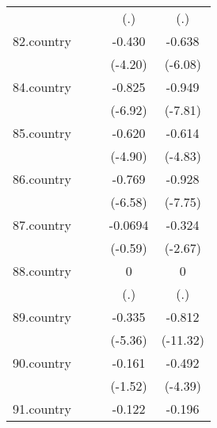 {\begin{tabular}{l*{4}{c}}
            &                     &                     &         (.)         &         (.)         \\
[1em]
82.country  &                     &                     &      -0.430\sym{***}&      -0.638\sym{***}\\
            &                     &                     &     (-4.20)         &     (-6.08)         \\
[1em]
84.country  &                     &                     &      -0.825\sym{***}&      -0.949\sym{***}\\
            &                     &                     &     (-6.92)         &     (-7.81)         \\
[1em]
85.country  &                     &                     &      -0.620\sym{***}&      -0.614\sym{***}\\
            &                     &                     &     (-4.90)         &     (-4.83)         \\
[1em]
86.country  &                     &                     &      -0.769\sym{***}&      -0.928\sym{***}\\
            &                     &                     &     (-6.58)         &     (-7.75)         \\
[1em]
87.country  &                     &                     &     -0.0694         &      -0.324\sym{**} \\
            &                     &                     &     (-0.59)         &     (-2.67)         \\
[1em]
88.country  &                     &                     &           0         &           0         \\
            &                     &                     &         (.)         &         (.)         \\
[1em]
89.country  &                     &                     &      -0.335\sym{***}&      -0.812\sym{***}\\
            &                     &                     &     (-5.36)         &    (-11.32)         \\
[1em]
90.country  &                     &                     &      -0.161         &      -0.492\sym{***}\\
            &                     &                     &     (-1.52)         &     (-4.39)         \\
[1em]
91.country  &                     &                     &      -0.122         &      -0.196         \\

\end{tabular}}
